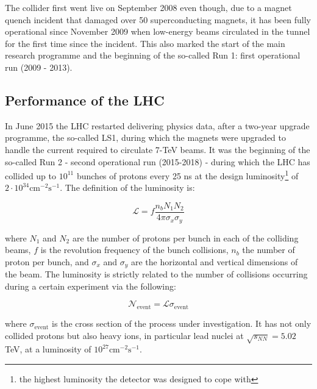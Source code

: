 		The collider first went live on September 2008 even though, due to a magnet quench incident that damaged over 50 superconducting magnets, it has been fully operational since November 2009 when low-energy beams circulated in the tunnel for the first time since the incident. This also marked the start of the main research programme and the beginning of the so-called Run 1: first operational run (2009 - 2013).


		\subsection*{Performance of the LHC}

			In June 2015 the \ac{LHC} restarted delivering physics data, after a two-year upgrade programme, the so-called \ac{LS1}, during which the magnets were upgraded to handle the current required to circulate 7-TeV beams. It was the beginning of the so-called Run 2 - second operational run (2015-2018) - during which the \ac{LHC} has collided up to $10^{11}$ bunches of protons every 25 ns at the design luminosity\footnote{the highest luminosity the detector was designed to cope with} of $2 \cdot 10^{34} \mathrm{cm}^{-2}\mathrm{s}^{-1}$. The definition of the luminosity is:

			\begin{equation}
				{\mathcal L} = f \frac{n_b N_1 N_2}{4 \pi \sigma_x \sigma_y}
			\label{eq:lumi}
			\end{equation}

			\noindent where $N_1$ and $N_2$ are the number of protons per bunch in each of the colliding beams, $f$ is the revolution frequency of the bunch collisions, $n_b$ the number of proton per bunch, and $\sigma_x$ and $\sigma_y$ are the horizontal and vertical dimensions of the beam. The luminosity is strictly related to the number of collisions occurring during a certain experiment via the following: 

			\begin{equation}
					{\mathcal N}_{\mathrm{event}} = {\mathcal L} \sigma_{\mathrm{event}}
			\label{eq:lumiEvt}
			\end{equation}

			\noindent where $\sigma_{\mathrm{event}}$ is the cross section of the process under investigation.  It has not only collided protons but also heavy ions, in particular lead nuclei at $\sqrt{s_{NN}} = 5.02$ TeV, at a luminosity of $10^{27} \mathrm{cm}^{-2} \mathrm{s}^{-1}$\cite{HI2015}.



